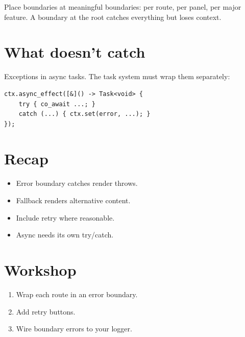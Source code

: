 Place boundaries at meaningful boundaries: per route, per
panel, per major feature. A boundary at the root catches
everything but loses context.

\section{What doesn't catch}

Exceptions in async tasks. The task system must wrap them
separately:

\begin{lstlisting}
ctx.async_effect([&]() -> Task<void> {
    try { co_await ...; }
    catch (...) { ctx.set(error, ...); }
});
\end{lstlisting}

\section{Recap}

\begin{recap}
\begin{itemize}[leftmargin=*]
  \item Error boundary catches render throws.
  \item Fallback renders alternative content.
  \item Include retry where reasonable.
  \item Async needs its own try/catch.
\end{itemize}
\end{recap}

\section*{Workshop}

\begin{enumerate}[leftmargin=*]
  \item Wrap each route in an error boundary.
  \item Add retry buttons.
  \item Wire boundary errors to your logger.
\end{enumerate}
